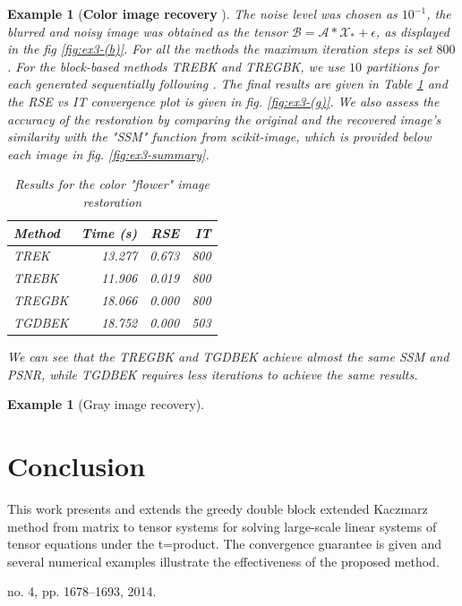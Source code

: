 \documentclass[11pt]{article}
\newtheorem{example}[theorem]{Example}
\def\fm#1{\mathcal{#1}}
\begin{document}
\begin{example}[\textbf{Color image recovery }]
The noise level was chosen as $10^{-1}$, the blurred and noisy image was obtained as the tensor $\fm B = \fm A * \fm X_\ast + \epsilon$, as displayed in the fig \ref{fig:ex3-(b)}. For all the methods the maximum iteration steps  is set $800$. For the block-based methods TREBK and TREGBK, we use $10$ partitions for each generated sequentially following \cite{du2020randomized}. The final results are given in Table \ref{tab:ex3} and the RSE vs IT convergence plot is given in fig. \ref{fig:ex3-(g)}. We also assess the accuracy of the restoration  by  comparing the original and the recovered image's similarity with the "SSM" function from scikit-image, which is provided below each image in fig. \ref{fig:ex3-summary}.
\begin{table}[ht]
\centering
\begin{tabular}{lrrr}
\toprule
Method & Time (s) & RSE & IT \\
\midrule
TREK   & 13.277 & 0.673 & 800 \\
TREBK  & 11.906 & 0.019 & 800 \\
TREGBK & 18.066 & 0.000 & 800 \\
TGDBEK & 18.752 & 0.000 & 503 \\
\bottomrule
\end{tabular}
\caption{Results for the color "flower" image restoration}
\label{tab:ex3}
\end{table}
We can see that the TREGBK and TGDBEK achieve almost the same SSM and PSNR,  while TGDBEK requires less iterations to achieve the same results.
\end{example}


\begin{example}[Gray image recovery]
\end{example}




\section{Conclusion}\label{sec:concl}
This work presents and extends the greedy double block extended Kaczmarz method from matrix to tensor  systems for solving large-scale linear systems of tensor equations under the t=product.  The convergence guarantee is given and  several numerical examples illustrate the effectiveness of the proposed method.
 

no. 4, pp. 1678–1693, 2014.
\end{document}
